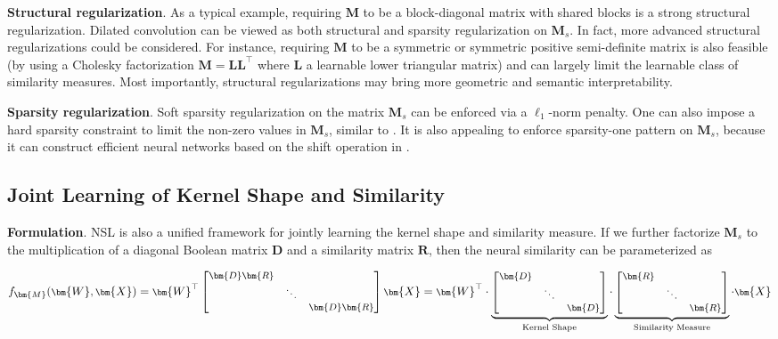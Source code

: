 \textbf{Structural regularization}. As a typical example, requiring $\bm{M}$ to be a block-diagonal matrix with shared blocks is a strong structural regularization. Dilated convolution can be viewed as both structural and sparsity regularization on $\bm{M}_s$. In fact, more advanced structural regularizations could be considered. For instance, requiring $\bm{M}$ to be a symmetric or symmetric positive semi-definite matrix is also feasible (by using a Cholesky factorization $\bm{M}=\bm{L}\bm{L}^\top$ where $\bm{L}$ a learnable lower triangular matrix) and can largely limit the learnable class of similarity measures. Most importantly, structural regularizations may bring more geometric and semantic interpretability.
\par

\textbf{Sparsity regularization}. Soft sparsity regularization on the matrix $\bm{M}_s$ can be enforced via a $\ell_1$-norm penalty. One can also impose a hard sparsity constraint to limit the non-zero values in $\bm{M}_s$, similar to \cite{mallya2018piggyback}. It is also appealing to enforce sparsity-one pattern on $\bm{M}_s$, because it can construct efficient neural networks based on the shift operation in \cite{wu2018shift}.

\subsection{Joint Learning of Kernel Shape and Similarity}\label{joint}

\textbf{Formulation}. NSL is also a unified framework for jointly learning the kernel shape and similarity measure. If we further factorize $\bm{M}_s$ to the multiplication of a diagonal Boolean matrix $\bm{D}$ and a similarity matrix $\bm{R}$, then the neural similarity can be parameterized as

\begin{equation}
\footnotesize
    f_{\bm{M}}(\bm{W},\bm{X})=\bm{W}^\top \begin{bmatrix}
    \bm{D}\bm{R} & & \\
    & \ddots & \\
    & & \bm{D}\bm{R}
  \end{bmatrix} \bm{X}=
  \bm{W}^\top \cdot \underbrace{\begin{bmatrix}
    \bm{D} & & \\
    & \ddots & \\
    & & \bm{D}
  \end{bmatrix}}_{\textnormal{Kernel Shape}} \cdot\underbrace{\begin{bmatrix}
    \bm{R} & & \\
    & \ddots & \\
    & & \bm{R}
  \end{bmatrix}}_{\textnormal{Similarity Measure}} \cdot\bm{X}
\end{equation}

